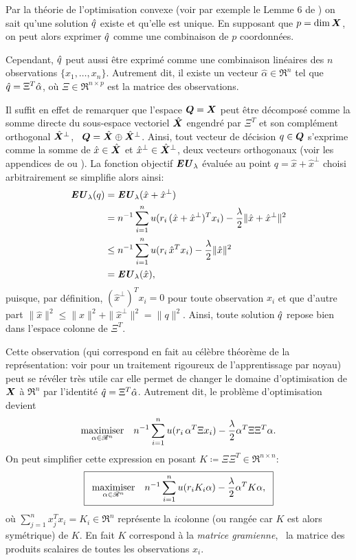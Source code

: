 Par la théorie de l'optimisation convexe (voir par exemple le Lemme 6 de
\cite{nesterov2009primal}) on sait qu'une solution $\qh$ existe et qu'elle est unique. En
supposant que $p = \dim\X$, on peut alors exprimer $\qh$ comme une combinaison de $p$
coordonnées.

Cependant, $\qh$ peut aussi être exprimé comme une combinaison linéaires des $n$
observations $\{x_1,\ldots,x_n\}$. Autrement dit, il existe un vecteur
$\hat\alpha \in \Re^n$ tel que $\qh = \Xi^T\hat\alpha$, où $\Xi \in \Re^{n \times p}$ est la matrice des
observations.

Il suffit en effet de remarquer que l'espace $\Q = \X$ peut être décomposé comme la somme
directe du sous-espace vectoriel $\hat\X$ engendré par $\Xi^T$ et son complément orthogonal
$\hat\X^\perp$, \ie\ $\Q = \hat\X \oplus \hat\X^\perp$. Ainsi, tout vecteur de décision
$q \in \Q$ s'exprime comme la somme de $\hat x\in\hat\X$ et
$\hat x^\perp \in \hat\X^\perp$, deux vecteurs orthogonaux (voir les appendices de
\cite{boyd2004convex} ou \cite{mohri2012foundations}). La fonction objectif $\EU_\lambda$
évaluée au point $q = \hat x + \hat x^\perp$ choisi arbitrairement se simplifie alors ainsi:
\begin{align}
  \EU_\lambda(q) &= \EU_\lambda(\hat x + \hat x^\perp)\\
           &= n^{-1}\sumi u(r_i\,(\hat x + \hat x^\perp)^Tx_i) - \frac{\lambda}{2}\|\hat x + \hat
             x^\perp\|^2\\
           &\leq n^{-1}\sumi u(r_i\,\hat x^Tx_i) - \frac{\lambda}{2}\|\hat x\|^2\\
           &=\EU_\lambda(\hat x),
\end{align}
puisque, par définition, $(\hat x^\perp)^Tx_i = 0$ pour toute observation $x_i$ et que d'autre
part $\|\hat x\|^2 \leq \|\hat x\|^2+\|\hat x^\perp\|^2 = \|q\|^2$. Ainsi, toute solution
$\qh$ repose bien dans l'espace colonne de $\Xi^T$.

Cette observation (qui correspond en fait au célèbre théorème de la représentation: voir
\cite{scholkopf2001learning} pour un traitement rigoureux de l'apprentissage par noyau)
peut se révéler très utile car elle permet de changer le domaine d'optimisation de $\X$ à
$\Re^n$ par l'identité $\qh = \Xi^T\hat\alpha$. Autrement dit, le problème d'optimisation devient
\begin{equation}
  \maximizeEquation[\alpha \in \Re^n]{n^{-1}\sumi u(r_i\,\alpha^T\Xi x_i) - \frac{\lambda}{2}\alpha^T\Xi\Xi^T\alpha.}
\end{equation}
On peut simplifier cette expression en posant $K \coloneqq \Xi\Xi^T \in \Re^{n \times n}$:
{\begin{equation}
  \boxed{
  \maximizeEquation[\alpha \in \Re^n]{n^{-1}\sumi u(r_iK_i\alpha) - \frac{\lambda}{2}\alpha^TK\alpha,}}
\end{equation}
\vspace{-\baselineskip}}
où $\sum_{j=1}^nx_j^Tx_i = K_i \in \Re^n$ représente la $i$\ieme colonne (ou rangée car
$K$ est alors symétrique) de $K$. En fait $K$ correspond à la \textit{matrice gramienne},
\ie\ la matrice des produits scalaires de toutes les observations $x_i$.

